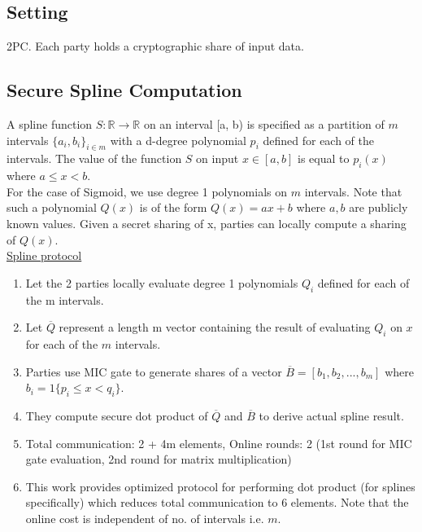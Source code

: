 \subsection{Setting}
2PC. Each party holds a cryptographic share of input data. 

\subsection{Secure Spline Computation}
A spline function $S : \mathbb{R} \rightarrow \mathbb{R}$ on an interval [a, b) is specified as a partition of $m$ intervals $\{a_i, b_i\}_{i \in m}$ with a d-degree polynomial $p_i$ defined for each of the intervals. The value of the function $S$ on input $x \in [a, b]$ is equal to $p_i(x)$ where $a \le x < b$.\\

For the case of Sigmoid, we use degree 1 polynomials on $m$ intervals. Note that such a polynomial $Q(x)$ is of the form $Q(x) = ax + b$ where $a, b$ are publicly known values. Given a secret sharing of x, parties can locally compute a sharing of $Q(x)$. \\

\underline{Spline protocol}
\begin{enumerate}
    \item Let the 2 parties locally evaluate degree 1 polynomials $Q_i$ defined for each of the m intervals.
    \item Let $\overline{Q}$ represent a length m vector containing the result of evaluating $Q_i$ on $x$ for each of the $m$ intervals.
    \item Parties use MIC gate to generate shares of a vector $\overline{B} = [b_1, b_2, ..., b_m]$ where $b_i = 1\{p_i \le x < q_i\}$.
    \item They compute secure dot product of $\overline{Q}$ and $\overline{B}$ to derive actual spline result.
    \item Total communication: 2 + 4m elements, Online rounds: 2 (1st round for MIC gate evaluation, 2nd round for matrix multiplication)
    \item This work provides optimized protocol for performing dot product (for splines specifically) which reduces total communication to 6 elements. Note that the online cost is independent of no. of intervals i.e. $m$.
\end{enumerate}




%
